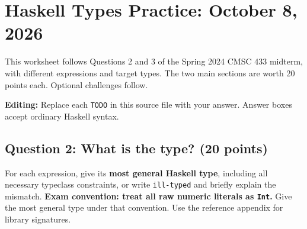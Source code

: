 \documentclass[11pt]{article}
\begin{document}
\raggedbottom
\section*{Haskell Types Practice: October 8, 2026}
This worksheet follows Questions 2 and 3 of the Spring 2024 CMSC 433
midterm, with different expressions and target types. The two main
sections are worth 20 points each. Optional challenges follow.

\textbf{Editing:} Replace each \texttt{TODO} in this source file with
your answer. Answer boxes accept ordinary Haskell syntax.

\subsection*{Question 2: What is the type? (20 points)}
For each expression, give its \textbf{most general Haskell type}, including
all necessary typeclass constraints, or write \texttt{ill-typed} and
briefly explain the mismatch. \textbf{Exam convention: treat all raw
numeric literals as \texttt{Int}.} Give the most general type under
that convention. Use the reference appendix for library signatures.
\end{document}
